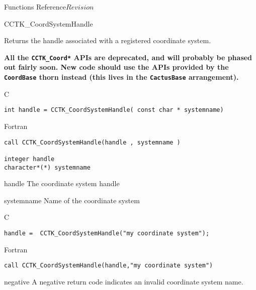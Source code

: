 \begin{cactuspart}{ Functions Reference}{}{$Revision$}
\begin{FunctionDescription}{CCTK\_CoordSystemHandle}%
{Returns the handle associated with a registered coordinate system.

\textbf{All the \texttt{CCTK\_Coord*} APIs are deprecated,
and will probably be phased out fairly soon.
New code should use the APIs provided by the \texttt{CoordBase} thorn
instead (this lives in the \texttt{CactusBase} arrangement).}
}
\label{CCTK-CoordSystemHandle}
\begin{SynopsisSection}
\begin{Synopsis}{C}
\begin{verbatim}int handle = CCTK_CoordSystemHandle( const char * systemname)\end{verbatim}
\end{Synopsis}
\begin{Synopsis}{Fortran}
\begin{verbatim}call CCTK_CoordSystemHandle(handle , systemname )

integer handle
character*(*) systemname \end{verbatim}
\end{Synopsis}
\end{SynopsisSection}
\begin{ParameterSection}
\begin{Parameter}{handle}
The coordinate system handle
\end{Parameter}
\begin{Parameter}{systemname}
Name of the coordinate system
\end{Parameter}
\end{ParameterSection}

\begin{ExampleSection}
\begin{Example}{C}
\begin{verbatim}
handle =  CCTK_CoordSystemHandle("my coordinate system");
\end{verbatim}
\end{Example}
\begin{Example}{Fortran}
\begin{verbatim}
call CCTK_CoordSystemHandle(handle,"my coordinate system")
\end{verbatim}
\end{Example}
\end{ExampleSection}
\begin{ErrorSection}
\begin{Error}{negative}
A negative return code indicates an invalid coordinate system name.
\end{Error}
\end{ErrorSection}
\end{FunctionDescription}


\end{cactuspart}
